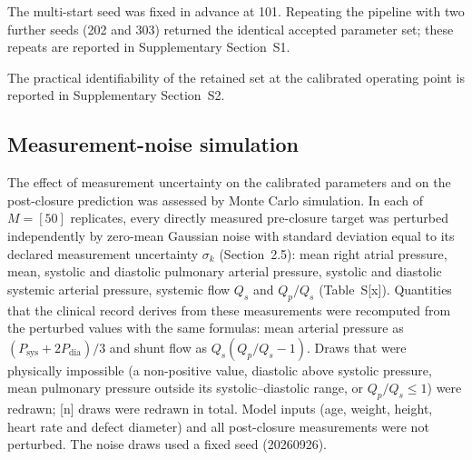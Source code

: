
The multi-start seed was fixed in advance at 101. Repeating the pipeline with
two further seeds (202 and 303) returned the identical accepted parameter set;
these repeats are reported in Supplementary Section~S1.

The practical identifiability of the retained set at the calibrated operating
point is reported in Supplementary Section~S2.

\subsection{Measurement-noise simulation}

The effect of measurement uncertainty on the calibrated parameters and on the
post-closure prediction was assessed by Monte Carlo simulation. In each of
$M = [50]$ replicates, every directly measured pre-closure target was
perturbed independently by zero-mean Gaussian noise with standard deviation
equal to its declared measurement uncertainty $\sigma_k$ (Section~2.5):
mean right atrial pressure, mean, systolic and diastolic pulmonary arterial
pressure, systolic and diastolic systemic arterial pressure, systemic flow
$Q_s$ and $Q_p/Q_s$ (Table~S[x]). Quantities that the clinical record derives
from these measurements were recomputed from the perturbed values with the same
formulas: mean arterial pressure as $(P_{\mathrm{sys}} + 2P_{\mathrm{dia}})/3$
and shunt flow as $Q_s(Q_p/Q_s - 1)$. Draws that were physically impossible
(a non-positive value, diastolic above systolic pressure, mean pulmonary
pressure outside its systolic--diastolic range, or $Q_p/Q_s \le 1$) were
redrawn; [n] draws were redrawn in total. Model inputs (age, weight, height,
heart rate and defect diameter) and all post-closure measurements were not
perturbed. The noise draws used a fixed seed (20260926).

